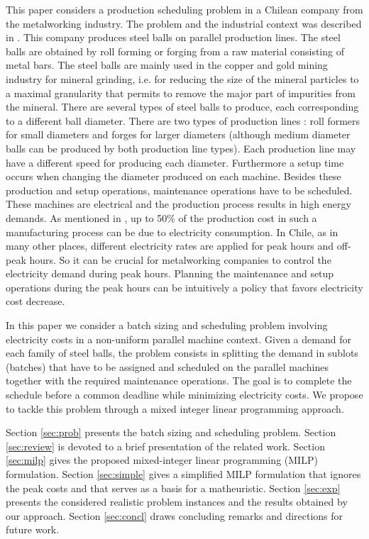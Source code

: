 This paper considers a production scheduling problem in a Chilean
company from the metalworking industry. The problem and the industrial
context was described in \cite{Urrutia:Thesis:2014}. This company
produces steel balls on parallel production lines. The steel balls are
obtained by roll forming or forging from a raw material consisting of
metal bars. The steel balls are mainly used in the copper and gold
mining industry for mineral grinding, i.e. for reducing the size of
the mineral particles to a maximal granularity that permits to remove
the major part of impurities from the mineral. There are several types
of steel balls to produce, each corresponding to a different ball
diameter. There are two types of production lines : roll formers for
small diameters and forges for larger diameters (although medium
diameter balls can be produced by both production line types). Each
production line may have a different speed for producing each
diameter. Furthermore a setup time occurs when changing the diameter
produced on each machine. Besides these production and setup
operations, maintenance operations have to be scheduled. These
machines are electrical and the production process results in high
energy demands. As mentioned in \cite{Urrutia:Thesis:2014}, up to 50\%
of the production cost in such a manufacturing process can be due to
electricity consumption. In Chile, as in many other places, different
electricity rates are applied for peak hours and off-peak hours. So it
can be crucial for metalworking companies to control the electricity
demand during peak hours. Planning the maintenance and setup
operations during the peak hours can be intuitively a policy that
favors electricity cost decrease.

In this paper we consider a batch sizing and scheduling problem
involving electricity costs in a non-uniform parallel machine
context. Given a demand for each family of steel balls, the problem
consists in splitting the demand in sublots (batches) that have to be
assigned and scheduled on the parallel machines together with the
required maintenance operations. The goal is to complete the schedule
before a common deadline while minimizing electricity costs. We
propose to tackle this problem through a mixed integer linear
programming approach.

Section \ref{sec:prob} presents the batch sizing and scheduling
problem. Section \ref{sec:review} is devoted to a brief presentation
of the related work. Section \ref{sec:milp} gives the proposed
mixed-integer linear programming (MILP) formulation. Section
\ref{sec:simple} gives a simplified MILP formulation that ignores the
peak costs and that serves as a basis for a matheuristic. Section
\ref{sec:exp} presents the considered realistic problem instances and
the results obtained by our approach. Section \ref{sec:concl} draws
concluding remarks and directions for future work.

